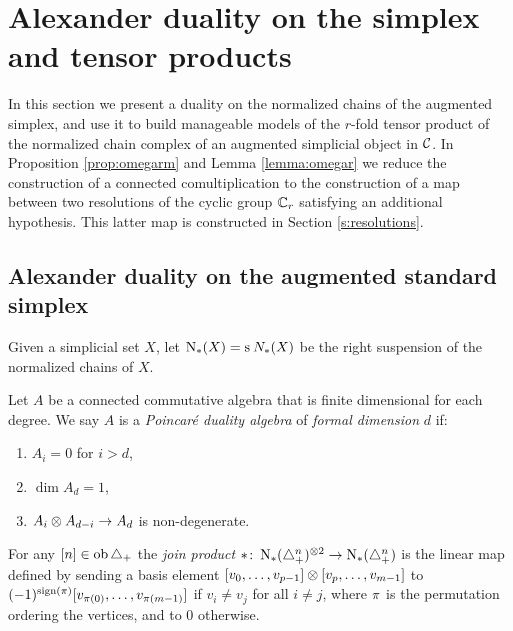 
\section{Alexander duality on the simplex and tensor products}\label{s:3complexes}

In this section we present a duality on the normalized chains of the augmented simplex, and use it to build manageable models of the $r$-fold tensor product of the normalized chain complex of an augmented simplicial object in $\mathcal{C}$. In Proposition \ref{prop:omegarm} and Lemma \ref{lemma:omegar} we reduce the construction of a connected comultiplication to the construction of a map between two resolutions of the cyclic group $\mathbb{C}_r$ satisfying an additional hypothesis. This latter map is constructed in Section \ref{s:resolutions}.

\subsection{Alexander duality on the augmented standard simplex}\label{s:alexander}
Given a simplicial set $X$, let $\operatorname{N}_{*}(X) = \operatorname{s}^{}N_{*}(X)$ be the right suspension of the normalized chains of $X$.


 

\begin{definition}\label{d:poincare_duality_algebra}
	Let $A$ be a connected commutative algebra that is finite dimensional for each degree.
	We say $A$ is a \textit{Poincar\'e duality algebra} of \textit{formal dimension} $d$ if:
	\begin{enumerate}
		\item\label{i:pd1} $A_i = 0$ for $i > d$,
		\item\label{i:pd2} $\dim A_d = 1$,
		\item\label{i:pd3} $A_i \otimes A_{d-i} \to A_d$ is non-degenerate.
	\end{enumerate}
\end{definition}

\begin{definition}\label{d:join_product}
	For any $[n] \in \operatorname{ob}\triangle_{+}$ the \textit{join product} $\ast  \colon  \operatorname{N}_{*}(\triangle_{+}^{n})^{\otimes 2} \to \operatorname{N}_{*}(\triangle_{+}^{n})$ is the linear map defined by sending a basis element $[v_0, \dots, v_{p-1}] \otimes [v_{p},\dots,v_{m-1}]$ to $(-1)^{\operatorname{sign}(\pi)}[v_{\pi(0)}, \dots, v_{\pi(m-1)}]$	if $v_i \neq v_j$ for all $i \neq j$, where $\pi$ is the permutation ordering the vertices, and to $0$ otherwise.
\end{definition}

